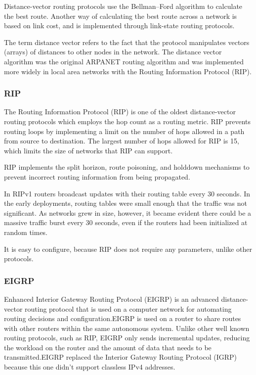\documentclass[a4paper,12pt]{book}
\begin{document}
Distance-vector routing protocols use the Bellman–Ford algorithm to calculate the best route. Another way of calculating the best route across a network is based on link cost, and is implemented through link-state routing protocols.

The term distance vector refers to the fact that the protocol manipulates vectors (arrays) of distances to other nodes in the network. The distance vector algorithm was the original ARPANET routing algorithm and was implemented more widely in local area networks with the Routing Information Protocol (RIP).

\subsubsection{RIP}
The Routing Information Protocol (RIP) is one of the oldest distance-vector routing protocols which employs the hop count as a routing metric. RIP prevents routing loops by implementing a limit on the number of hops allowed in a path from source to destination. The largest number of hops allowed for RIP is 15, which limits the size of networks that RIP can support.

RIP implements the split horizon, route poisoning, and holddown mechanisms to prevent incorrect routing information from being propagated.

In RIPv1 routers broadcast updates with their routing table every 30 seconds. In the early deployments, routing tables were small enough that the traffic was not significant. As networks grew in size, however, it became evident there could be a massive traffic burst every 30 seconds, even if the routers had been initialized at random times.

It is easy to configure, because RIP does not require any parameters, unlike other protocols.
\subsubsection{EIGRP}
Enhanced Interior Gateway Routing Protocol (EIGRP) is an advanced distance-vector routing protocol that is used on a computer network for automating routing decisions and configuration.EIGRP is used on a router to share routes with other routers within the same autonomous system. Unlike other well known routing protocols, such as RIP, EIGRP only sends incremental updates, reducing the workload on the router and the amount of data that needs to be transmitted.EIGRP replaced the Interior Gateway Routing Protocol (IGRP) because this one didn't support classless IPv4 addresses.
\end{document}
